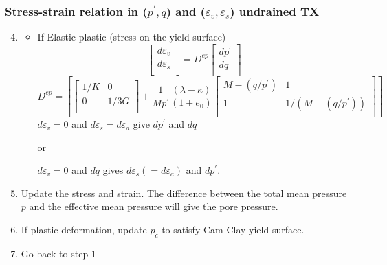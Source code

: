 \documentclass[notes]{beamer}
\begin{document}
\begin{frame}
\frametitle{Stress-strain relation in ($p^\prime, q$) and ($\varepsilon_v, \varepsilon_s$) undrained TX}		
\begin{enumerate}
	\setcounter{enumi}{3}
	\item 

	\begin{itemize}
		\item If Elastic-plastic (stress on the yield surface)
		\begin{equation*}
		\begin{bmatrix}
			d\varepsilon_v \\
			d\varepsilon_s \\
		\end{bmatrix} = %
		D^{ep}
		\begin{bmatrix}
			dp^\prime \\
			dq\\
		\end{bmatrix}
		\end{equation*}		
		\begin{equation*}
		D^{ep} =\left[
		\begin{bmatrix}
		1/K & 0 \\
		0 & 1/3G\\
		\end{bmatrix} + %
		\frac{1}{Mp^\prime}%
		\frac{(\lambda - \kappa)}{(1+e_0)}%
		\begin{bmatrix}
		M - (q/p^\prime) & 1     \\
		1 & 1/(M - (q/p^\prime)) \\
		\end{bmatrix}
		\right]
		\end{equation*}
		$d\varepsilon_v = 0$ and $d\varepsilon_s = d\varepsilon_a$ give $dp^\prime$ and $dq$ 
		
		or 
		
		$d\varepsilon_v = 0$ and $dq$ gives $d\varepsilon_s(=d\varepsilon_a)$ and $dp^\prime$.
	\end{itemize}
	\item Update the stress and strain. The difference between the total mean pressure $p$ and the effective mean pressure will give the pore pressure.
	\item If plastic deformation, update $p_c$ to satisfy Cam-Clay yield surface.
	\item Go back to step 1
\end{enumerate}
\end{frame}
\end{document}

